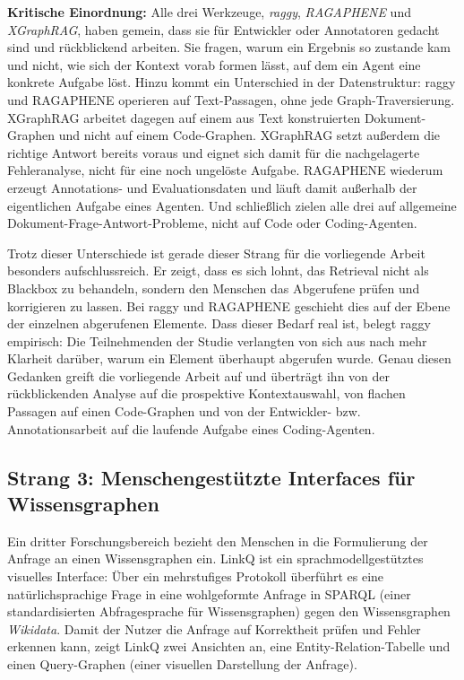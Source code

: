 \textbf{Kritische Einordnung:}
Alle drei Werkzeuge, \textit{raggy}, \textit{RAGAPHENE} und \textit{XGraphRAG}, haben gemein, dass sie für Entwickler oder Annotatoren gedacht sind und rückblickend arbeiten. Sie fragen, warum ein Ergebnis so zustande kam und nicht, wie sich der Kontext vorab formen lässt, auf dem ein Agent eine konkrete Aufgabe löst. Hinzu kommt ein Unterschied in der Datenstruktur: raggy und RAGAPHENE operieren auf Text-Passagen, ohne jede Graph-Traversierung. XGraphRAG arbeitet dagegen auf einem aus Text konstruierten Dokument-Graphen und nicht auf einem Code-Graphen. XGraphRAG setzt außerdem die richtige Antwort bereits voraus und eignet sich damit für die nachgelagerte Fehleranalyse, nicht für eine noch ungelöste Aufgabe. RAGAPHENE wiederum erzeugt Annotations- und Evaluationsdaten und läuft damit außerhalb der eigentlichen Aufgabe eines Agenten. Und schließlich zielen alle drei auf allgemeine Dokument-Frage-Antwort-Probleme, nicht auf Code oder Coding-Agenten.

Trotz dieser Unterschiede ist gerade dieser Strang für die vorliegende Arbeit besonders aufschlussreich. Er zeigt, dass es sich lohnt, das Retrieval nicht als Blackbox zu behandeln, sondern den Menschen das Abgerufene prüfen und korrigieren zu lassen. Bei raggy und RAGAPHENE geschieht dies auf der Ebene der einzelnen abgerufenen Elemente. Dass dieser Bedarf real ist, belegt raggy empirisch: Die Teilnehmenden der Studie verlangten von sich aus nach mehr Klarheit darüber, warum ein Element überhaupt abgerufen wurde. Genau diesen Gedanken greift die vorliegende Arbeit auf und überträgt ihn von der rückblickenden Analyse auf die prospektive Kontextauswahl, von flachen Passagen auf einen Code-Graphen und von der Entwickler- bzw. Annotationsarbeit auf die laufende Aufgabe eines Coding-Agenten.

\subsection{Strang 3: Menschengestützte Interfaces für Wissensgraphen}
Ein dritter Forschungsbereich bezieht den Menschen in die Formulierung der Anfrage an einen Wissensgraphen ein.
LinkQ \parencite{li2024linkq} ist ein sprachmodellgestütztes visuelles Interface: Über ein mehrstufiges Protokoll überführt es eine natürlichsprachige Frage in eine wohlgeformte Anfrage in SPARQL (einer standardisierten Abfragesprache für Wissensgraphen) gegen den Wissensgraphen \textit{Wikidata}. Damit der Nutzer die Anfrage auf Korrektheit prüfen und Fehler erkennen kann, zeigt LinkQ zwei Ansichten an, eine Entity-Relation-Tabelle und einen Query-Graphen (einer visuellen Darstellung der Anfrage).

